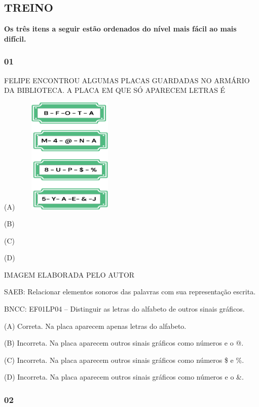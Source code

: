 \subsection{TREINO}\label{treino}

\textbf{Os três itens a seguir estão ordenados do nível mais fácil ao mais
difícil. }

\subsubsection{01}\label{section}

FELIPE ENCONTROU ALGUMAS PLACAS GUARDADAS NO ARMÁRIO DA BIBLIOTECA. A
PLACA EM QUE SÓ APARECEM LETRAS É

(A)
\includegraphics[width=2.16042in,height=2.19514in]{media/image82.png}

(B)

(C)

(D)

IMAGEM ELABORADA PELO AUTOR

SAEB: Relacionar elementos sonoros das palavras com sua representação escrita.

BNCC: EF01LP04 -- Distinguir as letras do alfabeto de outros sinais gráficos.

(A) Correta. Na placa aparecem apenas letras do alfabeto.

(B) Incorreta. Na placa aparecem outros sinais gráficos como números e o
@.

(C) Incorreta. Na placa aparecem outros sinais gráficos como números \$ e
\%.

(D) Incorreta. Na placa aparecem outros sinais gráficos como números e o
\&.

\protect\hypertarget{_heading=h.n783suxaxbxa}{}{}

\protect\hypertarget{_heading=h.pxfg7nlkhght}{}{}

\subsubsection{02}\label{section-1}


